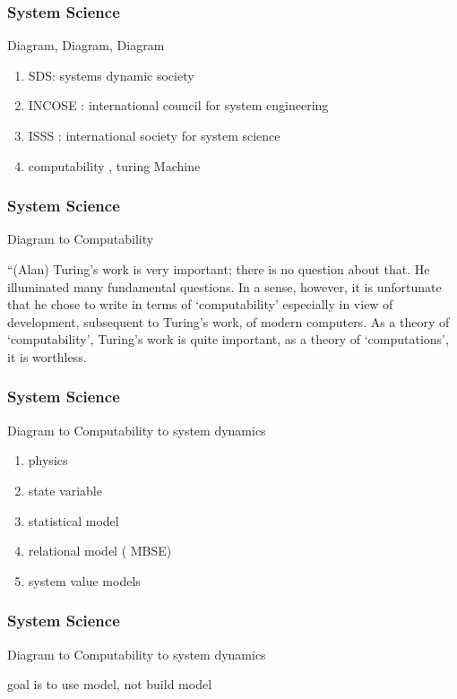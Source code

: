 \newpage
\begin{frame}
\frametitle{ System Science }
\begin{block}{Diagram, Diagram, Diagram}

\begin{enumerate}
    \item SDS: systems dynamic society 
  \item  INCOSE : international council for system engineering   
    \item ISSS : international society for system science
    \item  computability ,  turing Machine 
\end{enumerate}

\end{block}
\end{frame}


\newpage
\begin{frame}
\frametitle{ System Science }
\begin{block}{Diagram  to Computability }

“(Alan) Turing’s work is very important; there is no question about that. He illuminated many fundamental questions. In a sense, however, it is unfortunate that he chose to write in terms of ‘computability’ especially in view of development, subsequent to Turing’s work, of modern computers. As a theory of ‘computability’, Turing’s work is quite important, as a theory of ‘computations’, it is worthless.
\end{block}
\end{frame}



\newpage
\begin{frame}
\frametitle{ System Science }
\begin{block}{Diagram  to Computability  to system dynamics }

  \begin{enumerate}
      \item physics
       \item  state variable
     \item  statistical model
      \item  relational model ( MBSE)
     \item system value models 
  \end{enumerate}
\end{block}
\end{frame}


\newpage
\begin{frame}
\frametitle{ System Science }
\begin{block}{Diagram  to Computability  to system dynamics }

 goal is to use model, not build model 
 
\end{block}
\end{frame} 

